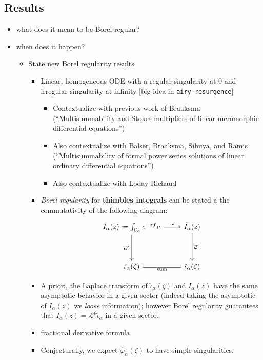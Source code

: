 \documentclass{article}
\theoremstyle{definition}
\newcommand*{\defeq}{\mathrel{\vcenter{\baselineskip0.5ex \lineskiplimit0pt
                     \hbox{\scriptsize.}\hbox{\scriptsize.}}}%
                     =}
\newcommand{\laplace}{\mathcal{L}}
\newcommand{\borel}{\mathcal{B}}
\begin{document}
\subsection{Results}

\color{orange}
\begin{itemize}
\item what does it mean to be Borel regular?
\item when does it happen?
\begin{itemize}
\item State new Borel regularity results
\begin{itemize}
\item Linear, homogeneous ODE with a regular singularity at 0 and irregular singularity at infinity [big idea in {\tt airy-resurgence}]
\begin{itemize}
\item Contextualize with previous work of Braaksma (``Multisummability and Stokes multipliers of linear meromorphic differential equations'')
\item Also contextualize with Balser, Braaksma, Sibuya, and Ramis (``Multisummability of formal power series solutions of linear ordinary differential equations'')
\item Also contextualize with Loday-Richaud
\end{itemize}
\item \emph{Borel regularity} for \textbf{thimbles integrals} can be stated a the commutativity of the following diagram:
\begin{equation}
\begin{tikzcd}
I_{\alpha}(z)\defeq\int_{\mathcal{C}_\alpha}e^{-zf}\nu \arrow[r,"\sim"]\arrow[dd, swap, "\laplace^\theta "] & \tilde{I}_{\alpha}(z)\arrow[dd,"\borel"]\\
& \\
\hat{\iota}_\alpha(\zeta)\arrow[r,equal,swap, "\text{sum}"] & \tilde{\iota}_{\alpha}(\zeta) 
\end{tikzcd}
\end{equation}
\item A priori, the Laplace transform of $\hat{\iota}_\alpha(\zeta)$ and $I_{\alpha}(z)$ have the same asymptotic behavior in a given sector (indeed taking the asymptotic of $I_\alpha(z)$ we \textit{loose} information); however Borel regularity guarantees that $I_{\alpha}(z)=\laplace^{\theta}\hat{\iota}_{\alpha}$ in a given sector.
\item fractional derivative formula
\item Conjecturally, we expect $\hat{\varphi}_\alpha(\zeta)$ to have simple singularities. 

\end{itemize}
\end{itemize}
\end{itemize}
\end{document}
